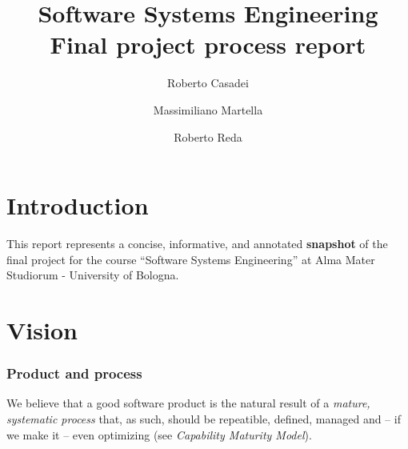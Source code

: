 \documentclass[11pt]{article}
\newcommand{\labelsec}[1]{\label{sec:#1}}
\newcommand{\xauthA}{Roberto Casadei }
\newcommand{\xauthB}{Massimiliano Martella}
\newcommand{\xauthC}{Roberto Reda}
\newcommand{\xunibo}{Alma Mater Studiorum -- University of Bologna}
\newcommand{\xaddrCE}{via Venezia 52}
\newcommand{\xcityCE}{47023 Cesena, Italy}
\begin{document}
\title{Software Systems Engineering\\
	Final project process report}

\author{\xauthA \and \xauthB \and \xauthC}



\maketitle



\section{Introduction}
\labelsec{intro}

 This report represents a concise, informative, and annotated \textbf{snapshot}
 of the final project for the course
  ``Software Systems Engineering'' at Alma Mater Studiorum - University of
  Bologna.

\section{Vision}
\labelsec{Vision}

\subsubsection*{Product and process}

We believe that a good software product is the natural result of a
\emph{mature, systematic process} that, as such, should be repeatible, defined,
managed and -- if we make it -- even optimizing (see \emph{Capability Maturity
Model}).
\end{document}
